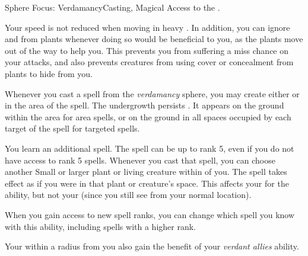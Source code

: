   \begin{magicalfeat}{Sphere Focus: Verdamancy}{Casting, Magical}
    \featpre Access to the  .

     Your speed is not reduced when moving in heavy .
    In addition, you can ignore  and  from plants whenever doing so would be beneficial to you, as the plants move out of the way to help you.
    This prevents you from suffering a miss chance on your attacks, and also prevents creatures from using cover or concealment from plants to hide from you.

     Whenever you cast a spell from the \textit{verdamancy} sphere, you may create either  or  in the area of the spell.
    The undergrowth persists .
    It appears on the ground within the area for area spells, or on the ground in all spaces occupied by each target of the spell for targeted spells.

     You learn an additional spell.
    The spell can be up to rank 5, even if you do not have access to rank 5 spells.
    Whenever you cast that spell, you can choose another Small or larger plant or living creature within \medrange of you.
    The spell takes effect as if you were in that plant or creature's space.
    This affects your  for the ability, but not your  (since you still see from your normal location).

    When you gain access to new spell ranks, you can change which spell you know with this ability, including spells with a higher rank.

     Your  within a \largearea radius  from you also gain the benefit of your \textit{verdant allies} ability.
  \end{magicalfeat}

